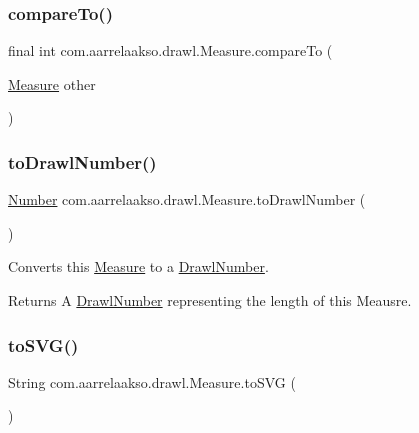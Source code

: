 \subsubsection{\texorpdfstring{compare\+To()}{compareTo()}}
{\footnotesize\ttfamily final int com.\+aarrelaakso.\+drawl.\+Measure.\+compare\+To (\begin{DoxyParamCaption}\item[{\hyperlink{classcom_1_1aarrelaakso_1_1drawl_1_1_measure}{Measure}}]{other }\end{DoxyParamCaption})}

\mbox{\label{classcom_1_1aarrelaakso_1_1drawl_1_1_measure_a6f01cfe45e01d43e89a73eaa17e3649f}} 
\subsubsection{\texorpdfstring{to\+Drawl\+Number()}{toDrawlNumber()}}
{\footnotesize\ttfamily \hyperlink{interfacecom_1_1aarrelaakso_1_1drawl_1_1_number}{Number} com.\+aarrelaakso.\+drawl.\+Measure.\+to\+Drawl\+Number (\begin{DoxyParamCaption}{ }\end{DoxyParamCaption})\hspace{0.3cm}{\ttfamily [protected]}}



Converts this \hyperlink{classcom_1_1aarrelaakso_1_1drawl_1_1_measure}{Measure} to a \hyperlink{classcom_1_1aarrelaakso_1_1drawl_1_1_drawl_number}{Drawl\+Number}. 

\begin{DoxyReturn}{Returns}
A \hyperlink{classcom_1_1aarrelaakso_1_1drawl_1_1_drawl_number}{Drawl\+Number} representing the length of this Meausre. 
\end{DoxyReturn}
\mbox{\label{classcom_1_1aarrelaakso_1_1drawl_1_1_measure_a7b6b8ce14224c2b74aee35ef4516ee88}} 
\subsubsection{\texorpdfstring{to\+S\+V\+G()}{toSVG()}}
{\footnotesize\ttfamily String com.\+aarrelaakso.\+drawl.\+Measure.\+to\+S\+VG (\begin{DoxyParamCaption}{ }\end{DoxyParamCaption})}



